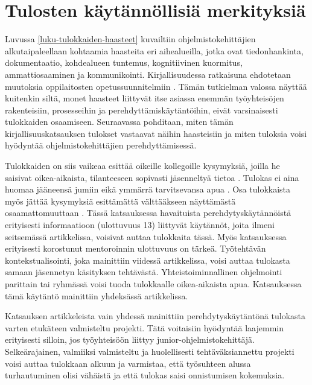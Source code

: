 \documentclass[utf8]{gradu3}
\begin{document}
\section{Tulosten käytännöllisiä merkityksiä}

Luvussa \ref{luku-tulokkaiden-haasteet} kuvailtiin ohjelmistokehittäjien alkutaipaleellaan kohtaamia haasteita eri aihealueilla, jotka ovat tiedonhankinta, dokumentaatio, kohdealueen tuntemus, kognitiivinen kuormitus, ammattiosaaminen ja kommunikointi. Kirjallisuudessa ratkaisuna ehdotetaan muutoksia oppilaitosten opetussuunnitelmiin %
\parencites%
    {radermacher-ym-2015}%
    {begel-simon-2008}%
    {begel-simon-2008-all-over-again}%
    {garousi-ym-2020}%
    {kulkarni-ym-2010}%
\relax.
%
Tämän tutkielman valossa näyttää kuitenkin siltä, monet haasteet liittyvät itse asiassa enemmän työyhteisöjen rakenteisiin, prosesseihin ja perehdyttämiskäytäntöihin, eivät varsinaisesti tulokkaiden osaamiseen. Seuraavassa pohditaan, miten tämän kirjallisuuskatsauksen tulokset vastaavat näihin haasteisiin ja miten tuloksia voisi hyödyntää ohjelmistokehittäjien perehdyttämisessä.

Tulokkaiden on siis vaikeaa esittää oikeille kollegoille kysymyksiä, joilla he saisivat oikea-aikaista, tilanteeseen sopivasti jäsenneltyä tietoa %
\parencites%
    {ju-ym-2021}%
    {britto-ym-2019}%
    {craig-ym-2018}%
    {matturro-ym-2017}%
    {dagenais-ym-2010}%
    {begel-simon-2008}%
\relax
%
. 
Tulokas ei aina huomaa jääneensä jumiin eikä ymmärrä tarvitsevansa apua \parencite{begel-simon-2008}. Osa tulokkaista myös jättää kysymyksiä esittämättä välttääkseen näyttämästä osaamattomuuttaan 
\parencites%
    {radermacher-ym-2015}%
    {begel-simon-2008}%
\relax
% 
. Tässä katsauksessa havaituista perehdytyskäytännöistä erityisesti informaatioon (ulottuvuus 13) liittyvät käytännöt, joita ilmeni seitsemässä artikkelissa, voisivat auttaa tulokkaita tässä. Myös katsauksessa erityisesti korostunut mentoroinnin ulottuvuus on tärkeä. Työtehtävän kontekstualisointi, joka mainittiin viidessä artikkelissa, voisi auttaa tulokasta samaan jäsennetyn käsityksen tehtävästä. Yhteistoiminnallinen ohjelmointi parittain tai ryhmässä voisi tuoda tulokkaalle oikea-aikaista apua. Katsauksessa tämä käytäntö mainittiin yhdeksässä artikkelissa. 

Katsauksen artikkeleista vain yhdessä mainittiin perehdytyskäytäntönä tulokasta varten etukäteen valmisteltu projekti. Tätä voitaisiin hyödyntää laajemmin erityisesti silloin, jos työyhteisöön liittyy junior-ohjelmistokehittäjä. Selkeärajainen, valmiiksi valmisteltu ja huolellisesti tehtäväksiannettu projekti voisi auttaa tulokkaan alkuun ja varmistaa, että työsuhteen alussa turhautuminen olisi vähäistä ja että tulokas saisi onnistumisen kokemuksia.
\end{document}
